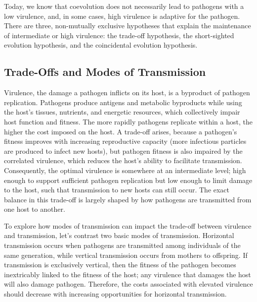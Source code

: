 \documentclass[
]{book}
\begin{document}
Today, we know that coevolution does not necessarily lead to pathogens with a low virulence, and, in some cases, high virulence is adaptive for the pathogen. There are three, non-mutually exclusive hypotheses that explain the maintenance of intermediate or high virulence: the trade-off hypothesis, the short-sighted evolution hypothesis, and the coincidental evolution hypothesis.

\hypertarget{trade-offs-and-modes-of-transmission}{%
\subsection{Trade-Offs and Modes of Transmission}\label{trade-offs-and-modes-of-transmission}}

Virulence, the damage a pathogen inflicts on its host, is a byproduct of pathogen replication. Pathogens produce antigens and metabolic byproducts while using the host's tissues, nutrients, and energetic resources, which collectively impair host function and fitness. The more rapidly pathogens replicate within a host, the higher the cost imposed on the host. A trade-off arises, because a pathogen's fitness improves with increasing reproductive capacity (more infectious particles are produced to infect new hosts), but pathogen fitness is also impaired by the correlated virulence, which reduces the host's ability to facilitate transmission. Consequently, the optimal virulence is somewhere at an intermediate level; high enough to support sufficient pathogen replication but low enough to limit damage to the host, such that transmission to new hosts can still occur. The exact balance in this trade-off is largely shaped by how pathogens are transmitted from one host to another.

To explore how modes of transmission can impact the trade-off between virulence and transmission, let's contrast two basic modes of transmission. Horizontal transmission occurs when pathogens are transmitted among individuals of the same generation, while vertical transmission occurs from mothers to offspring. If transmission is exclusively vertical, then the fitness of the pathogen becomes inextricably linked to the fitness of the host; any virulence that damages the host will also damage pathogen. Therefore, the costs associated with elevated virulence should decrease with increasing opportunities for horizontal transmission.
\end{document}
